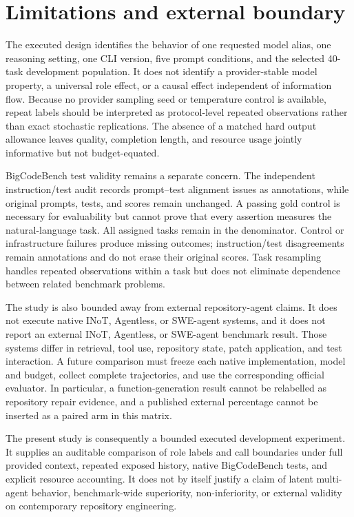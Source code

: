 \section{Limitations and external boundary}
\label{sec:dev40-limits}

The executed design identifies the behavior of one requested model alias, one reasoning setting, one CLI version, five prompt conditions, and the selected 40-task development population. It does not identify a provider-stable model property, a universal role effect, or a causal effect independent of information flow. Because no provider sampling seed or temperature control is available, repeat labels should be interpreted as protocol-level repeated observations rather than exact stochastic replications. The absence of a matched hard output allowance leaves quality, completion length, and resource usage jointly informative but not budget-equated.

BigCodeBench test validity remains a separate concern. The independent instruction/test audit records prompt--test alignment issues as annotations, while original prompts, tests, and scores remain unchanged. A passing gold control is necessary for evaluability but cannot prove that every assertion measures the natural-language task. All assigned tasks remain in the denominator. Control or infrastructure failures produce missing outcomes; instruction/test disagreements remain annotations and do not erase their original scores. Task resampling handles repeated observations within a task but does not eliminate dependence between related benchmark problems.

The study is also bounded away from external repository-agent claims. It does not execute native INoT, Agentless, or SWE-agent systems, and it does not report an external INoT, Agentless, or SWE-agent benchmark result. Those systems differ in retrieval, tool use, repository state, patch application, and test interaction. A future comparison must freeze each native implementation, model and budget, collect complete trajectories, and use the corresponding official evaluator. In particular, a function-generation result cannot be relabelled as repository repair evidence, and a published external percentage cannot be inserted as a paired arm in this matrix.

The present study is consequently a bounded executed development experiment. It supplies an auditable comparison of role labels and call boundaries under full provided context, repeated exposed history, native BigCodeBench tests, and explicit resource accounting. It does not by itself justify a claim of latent multi-agent behavior, benchmark-wide superiority, non-inferiority, or external validity on contemporary repository engineering.
